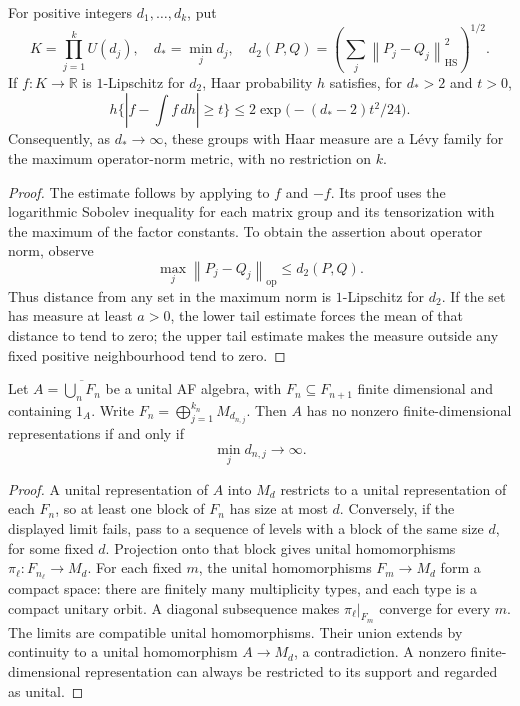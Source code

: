 \begin{lemma}\label{lem:un-product-concentration}
For positive integers \(d_1,\ldots,d_k\), put
\[
 K=\prod_{j=1}^k U(d_j),\quad d_*=\min_jd_j,\quad
 d_2(P,Q)=\left(\sum_j\left\lVert P_j-Q_j\right\rVert_{\mathrm{HS}}^2\right)^{1/2}.
\]
If \(f:K\to\mathbb R\) is \(1\)-Lipschitz for \(d_2\), Haar probability \(h\)
satisfies, for \(d_*>2\) and \(t>0\),
\begin{equation}\label{eq:un-product-concentration}
 h\{|f-\textstyle\int f\,dh|\geq t\}
 \leq2\exp\bigl(-(d_*-2)t^2/24\bigr).
\end{equation}
Consequently, as \(d_*\to\infty\), these groups with Haar measure
are a L\'evy family for the maximum operator-norm metric, with
no restriction on \(k\).
\end{lemma}
\begin{proof}
The estimate follows by applying \cite[Theorem 5.17]{Meckes2019}
to \(f\) and \(-f\). Its proof uses the logarithmic
Sobolev inequality for each matrix group and its tensorization
with the maximum of the factor constants.
To obtain the assertion about operator norm, observe
\[
 \max_j\left\lVert P_j-Q_j\right\rVert_{\mathrm{op}}\leq d_2(P,Q).
\]
Thus distance from any set in the maximum norm is \(1\)-Lipschitz
for \(d_2\). If the set has measure at least \(a>0\), the lower
tail estimate forces the mean of that distance to tend to zero;
the upper tail estimate makes the measure outside any fixed
positive neighbourhood tend to zero.
\end{proof}

\begin{lemma}\label{lem:un-block-growth}
Let \(A=\overline{\bigcup_n F_n}\) be a unital AF algebra, with
\(F_n\subseteq F_{n+1}\) finite dimensional and containing \(1_A\).
Write \(F_n=\bigoplus_{j=1}^{k_n}M_{d_{n,j}}\).
Then \(A\) has no nonzero finite-dimensional representations if
and only if
\[
 \min_j d_{n,j}\longrightarrow\infty.
\]
\end{lemma}
\begin{proof}
A unital representation of \(A\) into \(M_d\) restricts to a unital
representation of each \(F_n\), so at least one block of \(F_n\)
has size at most \(d\).
Conversely, if the displayed limit fails, pass to a sequence of
levels with a block of the same size \(d\), for some fixed \(d\).
Projection onto that block gives unital homomorphisms
\(\pi_\ell:F_{n_\ell}\to M_d\).
For each fixed \(m\), the unital homomorphisms \(F_m\to M_d\)
form a compact space: there are finitely many multiplicity types,
and each type is a compact unitary orbit.
A diagonal subsequence makes \(\pi_\ell|_{F_m}\) converge for
every \(m\). The limits are compatible unital homomorphisms.
Their union extends by continuity to a unital homomorphism \(A\to M_d\),
a contradiction. A nonzero finite-dimensional representation can
always be restricted to its support and regarded as unital.
\end{proof}

